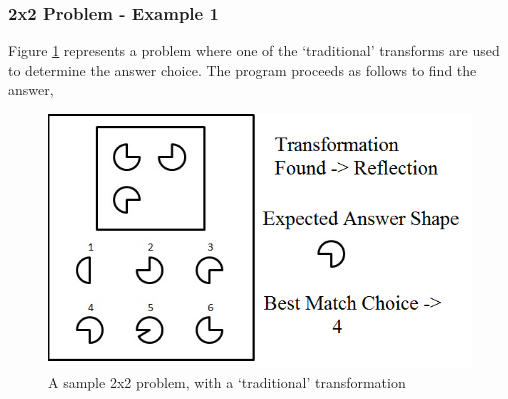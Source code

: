 \documentclass[10pt, letter]{article}
\begin{document}
\subsubsection*{2x2 Problem - Example 1}
Figure \ref{fig9} represents a problem where one of the `traditional' transforms are used to determine the answer choice. The program proceeds as follows to find the answer,
\begin{figure}[h!]
  \centering
    \includegraphics[scale = 0.5]{Images/Fig9}
    \caption{A sample 2x2 problem, with a `traditional' transformation}
  \label{fig9}
\end{figure}
\end{document}
